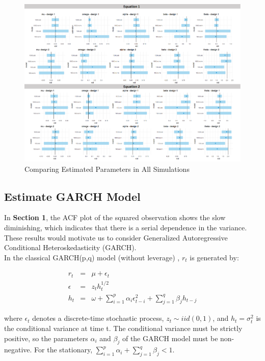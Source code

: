 \documentclass[a4paper]{article}
\begin{document}
\begin{figure}[h]
\centering
\includegraphics[height=0.45\textheight]{sim_res.png}
\caption{\label{fig:all_sim} Comparing Estimated Parameters in All Simulations}
\end{figure}

\subsection{Estimate GARCH Model}
In \textbf{Section 1}, the ACF plot of the squared observation shows the slow diminishing, which indicates that there is a serial dependence in the variance. These results would motivate us to consider Generalized Autoregressive Conditional Heteroskedasticity (GARCH). \\

In the classical GARCH(p,q) model (without leverage) \cite{bollerslev1986generalized}, $r_t$ is generated by:

\begin{eqnarray}
r_t &=& \mu + \epsilon_t \\
\epsilon &=& z_t h_t^{1/2}\\
h_t &=& \omega + \sum_{i=1}^p \alpha_i \epsilon_{t-i}^2 + \sum^q_{j=1} \beta_j h_{t-j}
\end{eqnarray}

where $\epsilon_t$ denotes a discrete-time stochastic process, $z_t \sim iid(0,1)$, and $h_t = \sigma_t^2$ is the conditional variance at time t. The conditional variance must be strictly positive, so the parameters $\alpha_i$ and $\beta_j$ of the GARCH model must be non-negative. For the stationary, $\sum^p_{i=1} \alpha_i + \sum^q_{j=1} \beta_j < 1$.
\end{document}
